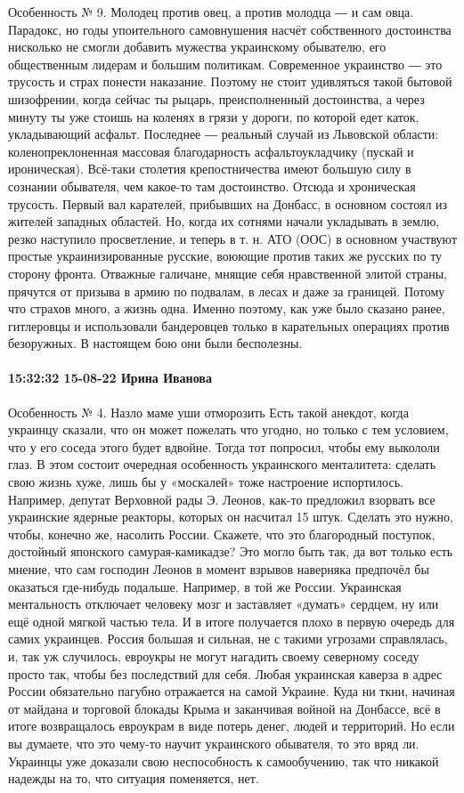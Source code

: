 Особенность № 9. Молодец против овец, а против молодца ― и сам овца. Парадокс,
но годы упоительного самовнушения насчёт собственного достоинства нисколько не
смогли добавить мужества украинскому обывателю, его общественным лидерам и
большим политикам. Современное украинство ― это трусость и страх понести
наказание. Поэтому не стоит удивляться такой бытовой шизофрении, когда сейчас
ты рыцарь, преисполненный достоинства, а через минуту ты уже стоишь на коленях
в грязи у дороги, по которой едет каток, укладывающий асфальт. Последнее ―
реальный случай из Львовской области: коленопреклоненная массовая благодарность
асфальтоукладчику (пускай и ироническая). Всё-таки столетия крепостничества
имеют большую силу в сознании обывателя, чем какое-то там достоинство. Отсюда и
хроническая трусость. Первый вал карателей, прибывших на Донбасс, в основном
состоял из жителей западных областей. Но, когда их сотнями начали укладывать в
землю, резко наступило просветление, и теперь в т. н. АТО (ООС) в основном
участвуют простые украинизированные русские, воюющие против таких же русских по
ту сторону фронта. Отважные галичане, мнящие себя нравственной элитой страны,
прячутся от призыва в армию по подвалам, в лесах и даже за границей. Потому что
страхов много, а жизнь одна. Именно поэтому, как уже было сказано ранее,
гитлеровцы и использовали бандеровцев только в карательных операциях против
безоружных. В настоящем бою они были бесполезны. 

\paragraph{15:32:32 15-08-22 Ирина Иванова}

Особенность № 4. Назло маме уши отморозить Есть такой анекдот, когда украинцу
сказали, что он может пожелать что угодно, но только с тем условием, что у его
соседа этого будет вдвойне. Тогда тот попросил, чтобы ему выкололи глаз. В этом
состоит очередная особенность украинского менталитета: сделать свою жизнь хуже,
лишь бы у «москалей» тоже настроение испортилось. Например, депутат Верховной
рады Э. Леонов, как-то предложил взорвать все украинские ядерные реакторы,
которых он насчитал 15 штук. Сделать это нужно, чтобы, конечно же, насолить
России. Скажете, что это благородный поступок, достойный японского
самурая-камикадзе? Это могло быть так, да вот только есть мнение, что сам
господин Леонов в момент взрывов наверняка предпочёл бы оказаться где-нибудь
подальше. Например, в той же России. Украинская ментальность отключает человеку
мозг и заставляет «думать» сердцем, ну или ещё одной мягкой частью тела. И в
итоге получается плохо в первую очередь для самих украинцев. Россия большая и
сильная, не с такими угрозами справлялась, и, так уж случилось, евроукры не
могут нагадить своему северному соседу просто так, чтобы без последствий для
себя. Любая украинская каверза в адрес России обязательно пагубно отражается на
самой Украине. Куда ни ткни, начиная от майдана и торговой блокады Крыма и
заканчивая войной на Донбассе, всё в итоге возвращалось евроукрам в виде потерь
денег, людей и территорий. Но если вы думаете, что это чему-то научит
украинского обывателя, то это вряд ли. Украинцы уже доказали свою неспособность
к самообучению, так что никакой надежды на то, что ситуация поменяется, нет.

